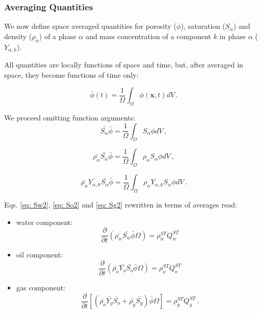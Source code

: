 \documentclass[authoryear,preprint,review,12pt]{elsarticle}
\begin{document}
\subsubsection{Averaging Quantities}

We now define space averaged quantities for porosity ($\phi$), saturation ($S_\alpha$) and density ($\rho_\alpha$) of a phase $\alpha$ and mass concentration of a component $k$ in phase $\alpha$ ($Y_{\alpha,k}$).

All quantities are locally functions of space and time, but, after averaged in space, they become functions of time only:

\begin{equation}
\bar{\phi} (t) = \frac{1}{\Omega}\int_{\Omega}\phi \left(\mathbf{x},t\right) dV \, .
\end{equation}

We proceed omitting function arguments:
\begin{equation}
\bar{S_\alpha}\bar{\phi} = \frac{1}{\Omega}\int_{\Omega}S_\alpha \phi dV \, ,
\end{equation}

\begin{equation}
\bar{\rho_\alpha}\bar{S_\alpha}\bar{\phi} = \frac{1}{\Omega}\int_{\Omega}\rho_\alpha S_\alpha \phi dV \, ,
\end{equation}

\begin{equation}
\bar{\rho_\alpha}\bar{Y_{\alpha,k}}\bar{S_\alpha}\bar{\phi} = \frac{1}{\Omega}\int_{\Omega}\rho_\alpha Y_{\alpha,k} S_\alpha \phi dV \, .
\end{equation}

Eqs. \eqref{eq: Sw2}, \eqref{eq: So2} and \eqref{eq: Sg2} rewritten in terms of averages read:

\begin{itemize}
\item water component:
\begin{equation}\label{eq: Sw3}
\frac{\partial}{\partial t} \left( \bar{\rho_w}\bar{S_w}\bar{\phi} \Omega \right) = \rho_w^{ST}Q_w^{ST}
\end{equation}

\item oil component:
\begin{equation}\label{eq: So3}
\frac{\partial}{\partial t} \left( \bar{\rho_o}\bar{Y_o}\bar{S_o}\bar{\phi} \Omega \right) = \rho_o^{ST}Q_o^{ST}
\end{equation}

\item gas component:
\begin{equation}\label{eq: Sg3}
\frac{\partial}{\partial t} \left[\left( \bar{\rho_o}\bar{Y_g} \bar{S_o} + \bar{\rho_g} \bar{S_g} \right) \bar{\phi} \Omega\right] = \rho_g^{ST}Q_g^{ST} \, .
\end{equation}
\end{itemize}
\end{document}
